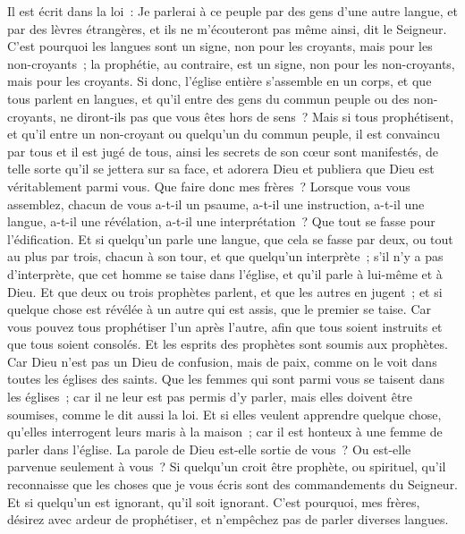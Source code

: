 \begin{multicols}{2}
Il est écrit dans la loi~: Je parlerai à ce peuple par des gens d'une autre langue, et par des lèvres étrangères, et ils ne m'écouteront pas même ainsi, dit le Seigneur.
C'est pourquoi les langues sont un signe, non pour les croyants, mais pour les non-croyants~; la prophétie, au contraire, est un signe, non pour les non-croyants, mais pour les croyants.
Si donc, l'église entière s'assemble en un corps, et que tous parlent en langues, et qu'il entre des gens du commun peuple ou des non-croyants, ne diront-ils pas que vous êtes hors de sens~?
Mais si tous prophétisent, et qu'il entre un non-croyant ou quelqu'un du commun peuple, il est convaincu par tous et il est jugé de tous,
ainsi les secrets de son cœur sont manifestés, de telle sorte qu'il se jettera sur sa face, et adorera Dieu et publiera que Dieu est véritablement parmi vous.
Que faire donc mes frères~? Lorsque vous vous assemblez, chacun de vous a-t-il un psaume, a-t-il une instruction, a-t-il une langue, a-t-il une révélation, a-t-il une interprétation~? Que tout se fasse pour l'édification.
Et si quelqu'un parle une langue, que cela se fasse par deux, ou tout au plus par trois, chacun à son tour, et que quelqu'un interprète~;
s'il n'y a pas d'interprète, que cet homme se taise dans l'église, et qu'il parle à lui-même et à Dieu.
Et que deux ou trois prophètes parlent, et que les autres en jugent~;
et si quelque chose est révélée à un autre qui est assis, que le premier se taise.
Car vous pouvez tous prophétiser l'un après l'autre, afin que tous soient instruits et que tous soient consolés.
Et les esprits des prophètes sont soumis aux prophètes.
Car Dieu n'est pas un Dieu de confusion, mais de paix, comme on le voit dans toutes les églises des saints.
Que les femmes qui sont parmi vous se taisent dans les églises~; car il ne leur est pas permis d'y parler, mais elles doivent être soumises, comme le dit aussi la loi.
Et si elles veulent apprendre quelque chose, qu'elles interrogent leurs maris à la maison~; car il est honteux à une femme de parler dans l'église.
 La parole de Dieu est-elle sortie de vous~? Ou est-elle parvenue seulement à vous~?
Si quelqu'un croit être prophète, ou spirituel, qu'il reconnaisse que les choses que je vous écris sont des commandements du Seigneur.
Et si quelqu'un est ignorant, qu'il soit ignorant.
C'est pourquoi, mes frères, désirez avec ardeur de prophétiser, et n'empêchez pas de parler diverses langues.

\end{multicols}
